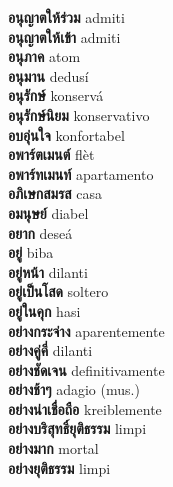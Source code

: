 \textbf{ อนุญาตให้ร่วม  } admiti \\
\textbf{ อนุญาตให้เข้า  } admiti \\
\textbf{ อนุภาค  } atom \\
\textbf{ อนุมาน  } dedusí \\
\textbf{ อนุรักษ์  } konservá \\
\textbf{ อนุรักษ์นิยม  } konservativo \\
\textbf{ อบอุ่นใจ  } konfortabel \\
\textbf{ อพาร์ตเมนต์  } flèt \\
\textbf{ อพาร์ทเมนท์  } apartamento \\
\textbf{ อภิเษกสมรส  } casa \\
\textbf{ อมนุษย์  } diabel \\
\textbf{ อยาก  } deseá \\
\textbf{ อยู่  } biba \\
\textbf{ อยู่หน้า  } dilanti \\
\textbf{ อยู่เป็นโสด  } soltero \\
\textbf{ อยู่ในคุก  } hasi \\
\textbf{ อย่างกระจ่าง  } aparentemente \\
\textbf{ อย่างคู่คี่  } dilanti \\
\textbf{ อย่างชัดเจน  } definitivamente \\
\textbf{ อย่างช้าๆ  } adagio (mus.) \\
\textbf{ อย่างน่าเชื่อถือ  } kreiblemente \\
\textbf{ อย่างบริสุทธิ์ยุติธรรม  } limpi \\
\textbf{ อย่างมาก  } mortal \\
\textbf{ อย่างยุติธรรม  } limpi \\
